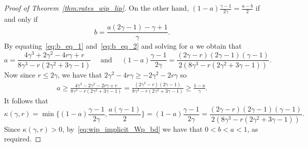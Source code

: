 \documentclass[11pt,a4paper,reqno,oneside]{amsart}
\theoremstyle{definition}
\theoremstyle{remark}
\numberwithin{equation}{section}
\begin{document}
\begin{proof}[Proof of Theorem~\ref{thm:rates_wip_lip}]
	On the other hand, $(1-a)\frac{\gamma-1}{2\gamma}=\frac{a-b}{2}$ if and only if 
	\begin{equation}\label{eq:b_eq_2}
		b = \frac{a(2\gamma-1)-\gamma+1}{\gamma}.
	\end{equation}
	By equating~\eqref{eq:b_eq_1} and~\eqref{eq:b_eq_2} and solving for $a$ we obtain that 
	\[ a=\frac{4\gamma^3+2\gamma^2 - 4r\gamma + r}{8\gamma^3 - r(2\gamma^2 + 3\gamma - 1)}\quad \text{ and }\quad (1-a)\frac{\gamma-1}{2\gamma}=\frac{(2\gamma-r)(2\gamma-1)(\gamma-1)}{2(8\gamma^3 - r(2\gamma^2 + 3\gamma - 1))}{.}
	\]
	Now since $r\le 2\gamma$, we have that $2\gamma^2-4r\gamma\ge -2\gamma^2-2r\gamma$ so
	\begin{align*}
		a \ge \frac{4\gamma^3-2\gamma^2 - 2r\gamma + r}{8\gamma^3 - r(2\gamma^2 + 3\gamma - 1)}=\frac{(2\gamma^2-r)(2\gamma-1)}{8\gamma^3 - r(2\gamma^2 + 3\gamma - 1)}
		\ge \frac{1-a}{\gamma}.
	\end{align*}
	It follows that
	\[ \kappa(\gamma,r)=\min\Big\{(1-a)\frac{\gamma-1}{2\gamma},\frac{a(\gamma-1)}{2} \Big\}=(1-a)\frac{\gamma-1}{2\gamma}=\frac{(2\gamma-r)(2\gamma-1)(\gamma-1)}{2(8\gamma^3 - r(2\gamma^2 + 3\gamma - 1))}.\]
	Since $\kappa(\gamma,r)>0$, by~\eqref{eq:wip_implicit_Wp_bd} we have that $0<b<a<1$, as required.
\end{proof}


\end{document}

